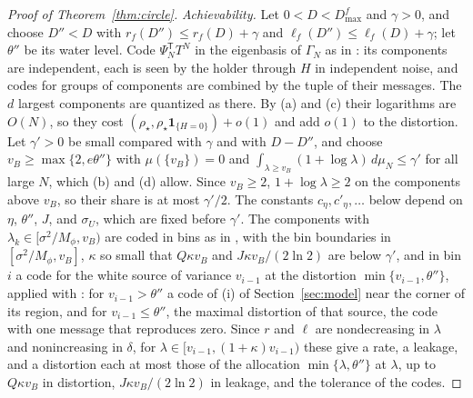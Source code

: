 \documentclass[11pt,onecolumn]{IEEEtran}
\begin{document}
\begin{proof}[Proof of Theorem~\ref{thm:circle}]
\emph{Achievability.} Let $0<D<D_{\max}^f$ and $\gamma>0$, and choose
$D''<D$ with $r_f(D'')\le r_f(D)+\gamma$ and $\ell_f(D'')\le\ell_f(D)+\gamma$;
let $\theta''$ be its water level. Code $\Psi_N^{\mathsf T}T^N$ in the
eigenbasis of $\Gamma_N$ as in \cite[proof of Theorem~26]{part3}: its
components are independent, each is seen by the holder through $H$ in
independent noise, and codes for groups of components are combined by
the tuple of their messages. The $d$ largest components are quantized
as there. By (a) and (c) their logarithms are $O(N)$, so they cost
$(\rho_\star,\rho_\star\mathbf 1_{\{H=0\}})+o(1)$ and add $o(1)$ to the
distortion. Let $\gamma'>0$ be small compared with $\gamma$ and with
$D-D''$, and choose $v_B\ge\max\{2,e\theta''\}$ with $\mu(\{v_B\})=0$ and
$\int_{\lambda\ge v_B}(1+\log\lambda)\,d\mu_N\le\gamma'$ for all large $N$,
which (b) and (d) allow. Since $v_B\ge2$, $1+\log\lambda\ge2$ on the
components above $v_B$, so their share is at most $\gamma'/2$. The
constants $c_\eta,c'_\eta,\dots$ below depend on $\eta$, $\theta''$, $J$,
and $\sigma_U$, which are fixed before $\gamma'$. The components with
$\lambda_k\in[\sigma^2/M_\phi,v_B)$ are coded in bins as in
\cite[proof of Theorem~26]{part3}, with the bin boundaries in
$[\sigma^2/M_\phi,v_B]$, $\kappa$ so small that $Q\kappa v_B$ and
$J\kappa v_B/(2\ln2)$ are below $\gamma'$, and in bin $i$ a code for the
white source of variance $v_{i-1}$ at the distortion
$\min\{v_{i-1},\theta''\}$, applied with \cite[Lemma~12]{part3}: for
$v_{i-1}>\theta''$ a code of (i) of Section~\ref{sec:model} near the corner
of its region, and for $v_{i-1}\le\theta''$, the maximal distortion of
that source, the code with one message that reproduces zero. Since $r$
and $\ell$ are nondecreasing in $\lambda$ and nonincreasing in $\delta$,
for $\lambda\in[v_{i-1},(1+\kappa)v_{i-1})$ these give a rate, a leakage, and
a distortion each at most those of the allocation
$\min\{\lambda,\theta''\}$ at $\lambda$, up to $Q\kappa v_B$ in distortion,
$J\kappa v_B/(2\ln2)$ in leakage, and the tolerance of the codes.


\end{proof}
\end{document}
